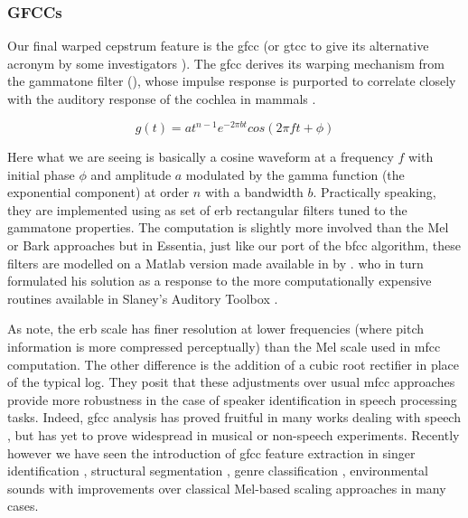 {{{{\subsubsection{GFCCs}

Our final warped cepstrum feature is the \acrshort{gfcc} (or \acrshort{gtcc} to give its alternative acronym by some investigators \citep{Valero2012, Fathima2013}). The \acrshort{gfcc} derives its warping mechanism from the gammatone filter (), whose impulse response is purported to correlate closely with the auditory response of the cochlea in mammals \citep{Patterson1987, Valero2012}.

\begin{equation}
\label{eq:gammatone}	
g(t)=at^{n-1}e^{-2\pi bt}cos(2\pi ft + \phi)
\end{equation}

Here what we are seeing is basically a cosine waveform at a frequency $f$ with initial phase $\phi$ and amplitude $a$ modulated by the gamma function (the exponential component) at order $n$ with a bandwidth $b$. Practically speaking, they are implemented using as set of \acrshort{erb} rectangular filters tuned to the gammatone properties. The computation is slightly more involved than the Mel or Bark approaches but in  Essentia, just like our port of the \acrshort{bfcc} algorithm, these filters are  modelled on a Matlab version made available in by \cite{Ellis2009}. who in turn formulated his solution as a response to the more computationally expensive routines available in Slaney's Auditory Toolbox \citep{Slaney1998}. 

 As \cite{Zhao2013} note, the \acrshort{erb} scale has finer resolution at lower frequencies (where pitch information is more compressed perceptually) than the Mel scale used in \acrshort{mfcc} computation. The other difference is the addition of a cubic root rectifier in place of the typical log. They posit that these adjustments over usual \acrshort{mfcc} approaches provide more robustness in the case of speaker identification in speech processing tasks. Indeed, \acrshort{gfcc} analysis has proved fruitful in many works dealing with speech \citep{Abdulla2002, Schl2007}, but has yet to prove widespread in musical or non-speech experiments. Recently however we have seen the introduction of \acrshort{gfcc} feature extraction in singer identification \citep{Cai2011}, structural segmentation \citep{Tian2016}, genre classification \citep{Johnson-Roberson2017, Grekow2017}, environmental sounds \citep{Valero2012} with improvements over classical Mel-based scaling approaches in many cases. 


}}}}
